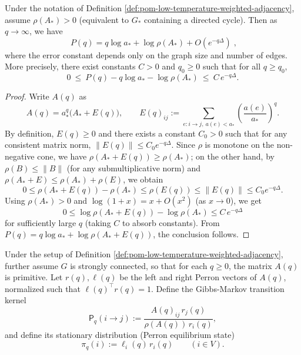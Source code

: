 \begin{theorem}\label{thm:pom-low-temperature-three-term-expansion}
Under the notation of Definition \ref{def:pom-low-temperature-weighted-adjacency}, assume \(\rho(A_*)>0\) (equivalent to \(G_*\) containing a directed cycle).
Then as \(q\to\infty\), we have
\[
\boxed{\;
P(q)=q\log a_*+\log\rho(A_*)+O(e^{-q\Delta})\; },
\]
where the error constant depends only on the graph size and number of edges.
More precisely, there exist constants \(C>0\) and \(q_0\ge 0\) such that for all \(q\ge q_0\),
\[
0\ \le\ P(q)-q\log a_*-\log\rho(A_*)\ \le\ C\,e^{-q\Delta}.
\]
\end{theorem}
\begin{proof}
Write \(A(q)\) as
\[
A(q)=a_*^{q}\bigl(A_*+E(q)\bigr),
\qquad
E(q)_{ij}:=\sum_{e:i\to j,\ a(e)<a_*}\left(\frac{a(e)}{a_*}\right)^q.
\]
By definition, \(E(q)\ge 0\) and there exists a constant \(C_0>0\) such that for any consistent matrix norm, \(\|E(q)\|\le C_0 e^{-q\Delta}\).
Since \(\rho\) is monotone on the non-negative cone, we have \(\rho(A_*+E(q))\ge \rho(A_*)\);
on the other hand, by \(\rho(B)\le \|B\|\) (for any submultiplicative norm) and \(\rho(A_*+E)\le \rho(A_*)+\rho(E)\), we obtain
\[
0\le \rho(A_*+E(q))-\rho(A_*)\le \rho(E(q))\le \|E(q)\|\le C_0 e^{-q\Delta}.
\]
Using \(\rho(A_*)>0\) and \(\log(1+x)=x+O(x^2)\) (as \(x\to 0\)), we get
\[
0\le \log\rho(A_*+E(q))-\log\rho(A_*)\le C\,e^{-q\Delta}
\]
for sufficiently large \(q\) (taking \(C\) to absorb constants).
From
\(
P(q)=q\log a_*+\log\rho(A_*+E(q))
\),
the conclusion follows.
\end{proof}

\begin{definition}\label{def:pom-zero-temperature-gibbs-markov}
Under the setup of Definition \ref{def:pom-low-temperature-weighted-adjacency}, further assume \(G\) is strongly connected, so that for each \(q\ge0\), the matrix \(A(q)\) is primitive.
Let \(r(q),\ell(q)\) be the left and right Perron vectors of \(A(q)\), normalized such that \(\ell(q)^\top r(q)=1\).
Define the Gibbs-Markov transition kernel
\[
\mathsf{P}_q(i\to j):=\frac{A(q)_{ij}\,r_j(q)}{\rho(A(q))\,r_i(q)},
\]
and define its stationary distribution (Perron equilibrium state)
\[
\pi_q(i):=\ell_i(q)\,r_i(q)\qquad(i\in V).
\]
\end{definition}

